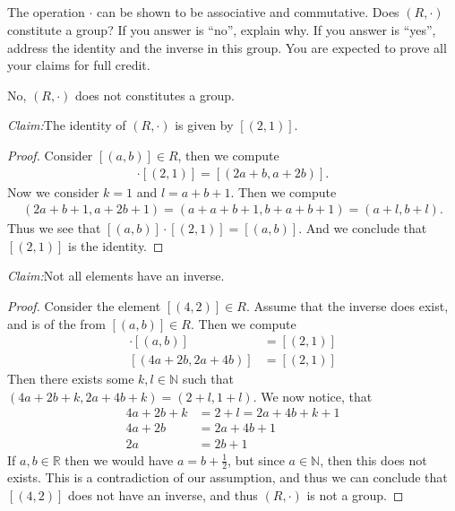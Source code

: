 \documentclass[10pt]{armath}
\newcommand{\R}{\mathbb{R}}
\newcommand{\N}{\mathbb{N}}
\newenvironment{claim}[1]{\par\noindent\textit{Claim:}\space#1}{}
\begin{document}
\subsection{}%
\label{sub:1e}

The operation $\cdot$ can be shown to be associative and commutative. Does
$(R,\cdot)$ constitute a group? If you answer is ``no'', explain why. If you
answer is ``yes'', address the identity and the inverse in this group. You are
expected to prove all your claims for full credit.

No, $(R,\cdot)$ does not constitutes a group.
\begin{claim}
  The identity of $(R,\cdot)$ is given by $[(2,1)]$.
\end{claim}
\begin{proof}
  Consider $[(a,b)]\in R$, then we compute
  \begin{align*}
    [(a,b)]\cdot[(2,1)]=[(2a+b,a+2b)].
  \end{align*}
  Now we consider $k=1$ and $l=a+b+1$. Then we compute
  \begin{align*}
    (2a+b+1,a+2b+1)=(a+a+b+1,b+a+b+1)=(a+l,b+l).
  \end{align*}
  Thus we see that $[(a,b)]\cdot[(2,1)]=[(a,b)]$. And we conclude that
  $[(2,1)]$ is the identity.
\end{proof}
\begin{claim}
  Not all elements have an inverse.
\end{claim}
\begin{proof}
  Consider the element $[(4,2)]\in R$. Assume that the inverse does exist,
  and is of the from $[(a,b)]\in R$. Then we compute
  \begin{align*}
    [(4,2)]\cdot[(a,b)]&=[(2,1)]\\
    [(4a+2b,2a+4b)]&=[(2,1)]
  \end{align*}
  Then there exists some $k,l\in\N$ such that $(4a+2b+k,2a+4b+k)=(2+l,1+l)$.
  We now notice, that
  \begin{align*}
    4a+2b+k&=2+l=2a+4b+k+1\\
    4a+2b&=2a+4b+1\\
    2a&=2b+1
  \end{align*}
  If $a,b\in\R$ then we would have $a=b+\frac{1}{2}$, but since $a\in\N$, then
  this does not exists. This is a contradiction of our assumption, and thus we
  can conclude that $[(4,2)]$ does not have an inverse, and thus $(R,\cdot)$
  is not a group.
\end{proof}
\end{document}
